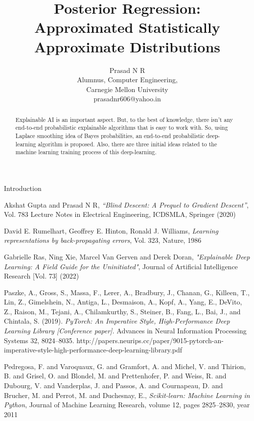 \documentclass{article}
\title{Posterior Regression: Approximated Statistically Approximate Distributions}
\author{Prasad N R\\Alumnus, Computer Engineering, \\Carnegie Mellon University\\prasadnr606@yahoo.in}
\begin{document}
	\maketitle 
	\begin{abstract}
		Explainable AI is an important aspect. But, to the best of knowledge, there isn't any end-to-end probabilistic explainable algorithms that is easy to work with. So, using Laplace smoothing idea of Bayes probabilities, an end-to-end probabilistic deep-learning algorithm is proposed. Also, there are three initial ideas related to the machine learning training process of this deep-learning.
	\end{abstract}
	
	\begin{section}{Introduction}
	
	\end{section}
	
	\begin{thebibliography}{1}
		
		Akshat Gupta and Prasad N R, \textit{“Blind Descent: A Prequel to Gradient Descent”}, Vol. 783 Lecture Notes in Electrical Engineering,
		ICDSMLA, Springer (2020)
		
		David E. Rumelhart, Geoffrey E. Hinton, Ronald J. Williams,
		\textit{Learning representations by back-propagating errors}, Vol. 323,
		Nature, 1986
		
		Gabrielle Ras, Ning Xie, Marcel Van Gerven and Derek Doran, \textit{"Explainable Deep Learning: A Field Guide for the Uninitiated"}, Journal of Artificial Intelligence Research [Vol. 73] (2022)
		
		Paszke, A., Gross, S., Massa, F., Lerer, A., Bradbury, J., Chanan, G., Killeen, T., Lin, Z., Gimelshein, N., Antiga, L., Desmaison, A., Kopf, A., Yang, E., DeVito, Z., Raison, M., Tejani, A., Chilamkurthy, S., Steiner, B., Fang, L., Bai, J., and Chintala, S. (2019). \textit{PyTorch: An Imperative Style, High-Performance Deep Learning Library [Conference paper].} Advances in Neural Information Processing Systems 32, 8024–8035. http://papers.neurips.cc/paper/9015-pytorch-an-imperative-style-high-performance-deep-learning-library.pdf
	
		Pedregosa, F. and Varoquaux, G. and Gramfort, A. and Michel, V.
		and Thirion, B. and Grisel, O. and Blondel, M. and Prettenhofer, P.
		and Weiss, R. and Dubourg, V. and Vanderplas, J. and Passos, A. and
		Cournapeau, D. and Brucher, M. and Perrot, M. and Duchesnay, E., \textit{Scikit-learn: Machine Learning in Python},
		Journal of Machine Learning Research, volume 12, pages 2825--2830, year 2011
	
	\end{thebibliography}
\end{document}
